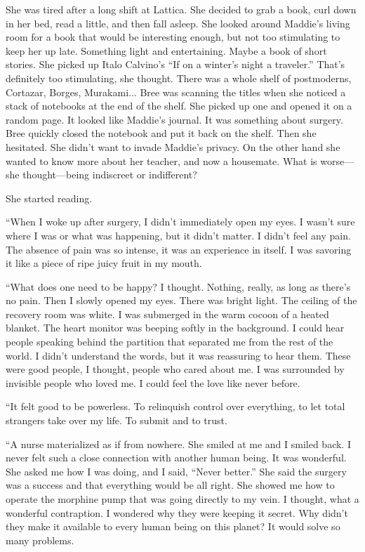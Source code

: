 \documentclass{memoir}
\begin{document}
She was tired after a long shift at Lattica. She decided to grab a book, curl down in her bed, read a little, and then fall asleep. She looked around Maddie's living room for a book that would be interesting enough, but not too stimulating to keep her up late. Something light and entertaining. Maybe a book of short stories. She picked up Italo Calvino's ``If on a winter's night a traveler.'' That's definitely too stimulating, she thought. There was a whole shelf of postmoderns, Cortazar, Borges, Murakami... Bree was scanning the titles when she noticed a stack of notebooks at the end of the shelf. She picked up one and opened it on a random page. It looked like Maddie's journal. It was something about surgery. Bree quickly closed the notebook and put it back on the shelf. Then she hesitated. She didn't want to invade Maddie's privacy. On the other hand she wanted to know more about her teacher, and now a housemate. What is worse---she thought---being indiscreet or indifferent?

She started reading.

``When I woke up after surgery, I didn't immediately open my eyes. I wasn't sure where I was or what was happening, but it didn't matter. I didn't feel any pain. The absence of pain was so intense, it was an experience in itself. I was savoring it like a piece of ripe juicy fruit in my mouth. 

``What does one need to be happy? I thought. Nothing, really, as long as there's no pain. Then I slowly opened my eyes. There was bright light. The ceiling of the recovery room was white. I was submerged in the warm cocoon of a heated blanket. The heart monitor was beeping softly in the background. I could hear people speaking behind the partition that separated me from the rest of the world. I didn't understand the words, but it was reassuring to hear them. These were good people, I thought, people who cared about me. I was surrounded by invisible people who loved me. I could feel the love like never before. 

``It felt good to be powerless. To relinquish control over everything, to let total strangers take over my life. To submit and to trust.

``A nurse materialized as if from nowhere. She smiled at me and I smiled back. I never felt such a close connection with another human being. It was wonderful. She asked me how I was doing, and I said, ``Never better.'' She said the surgery was a success and that everything would be all right. She showed me how to operate the morphine pump that was going directly to my vein. I thought, what a wonderful contraption. I wondered why they were keeping it secret. Why didn't they make it available to every human being on this planet? It would solve so many problems.
\end{document}
